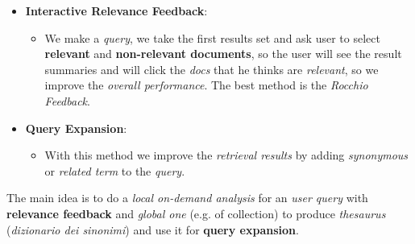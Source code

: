 \documentclass{article}
\begin{document}
\begin{itemize}
\item \textbf{Interactive Relevance Feedback}:
\begin{itemize}
\item We make a \emph{query}, we take the first results set and ask user to select \textbf{relevant} and \textbf{non-relevant documents}, so the user will see the result summaries and will click the \emph{docs} that he thinks are \emph{relevant}, so we improve the \emph{overall performance}. The best method is the \emph{Rocchio Feedback}.
\end{itemize}
\item \textbf{Query Expansion}:
\begin{itemize}
\item With this method we improve the \emph{retrieval results} by adding \emph{synonymous} or \emph{related term} to the \emph{query}. 
\end{itemize}
\end{itemize}
The main idea is to do a \emph{local on-demand analysis} for an \emph{user query} with \textbf{relevance feedback} and \emph{global one} (e.g. of collection) to produce \emph{thesaurus} (\emph{dizionario dei sinonimi}) and use it for \textbf{query expansion}. 
\end{document}
